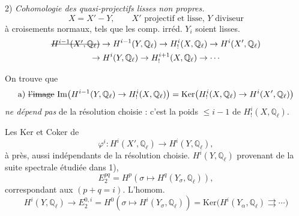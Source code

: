 \documentclass[11pt,a4paper]{article}
\begin{document}

2) \emph{Cohomologie des   quasi-projectifs lisses non propres.}
\[
  X = X' - Y, \qquad X' \text{ projectif et lisse, } Y \text{ diviseur}
\]
à croisements normaux, tels que les comp. irréd. $Y_i$ soient lisses.
\begin{gather*}
  \text{\struck{$H^{i-1}(X', \mathbb{Q}_\ell)$}} \to H^{i-1}(Y, \mathbb{Q}_\ell) \to H^{i}_{!}(X, \mathbb{Q}_\ell) \to H^{i}(X', \mathbb{Q}_\ell) \\
  \to H^{i}(Y, \mathbb{Q}_\ell) \to H^{i+1}_{!}(X, \mathbb{Q}_\ell) \to \cdots
  \end{gather*}

On trouve que
\[
  \text{a) \struck{l'image}}\ \mathrm{Im}\bigl(H^{i-1}(Y, \mathbb{Q}_\ell) \to H^{i}_{!}(X, \mathbb{Q}_\ell)\bigr)
  = \mathrm{Ker}\bigl(H^{i}_{!}(X, \mathbb{Q}_\ell) \to H^{i}(X', \mathbb{Q}_\ell)\bigr)
\]
\emph{ne dépend pas} de la résolution choisie : c'est la 
 poids $\leqslant i-1$ de $H^{i}_{!}(X, \mathbb{Q}_\ell)$.

\struck{\ill{}} Les Ker et Coker de
\[
  \varphi^{i} : H^{i}(X', \mathbb{Q}_\ell) \to H^{i}(Y, \mathbb{Q}_\ell),
\]
à   près,  aussi indépendants de la
résolution choisie. \struck{\ill{}}  \struck{\ill{}} \ill{} $H^{i}(Y, \mathbb{Q}_\ell)$ provenant de la
suite spectrale étudiée dans 1),
\[
  E_2^{pq} = H^{p}(\sigma \mapsto H^{q}(Y_\sigma, \mathbb{Q}_\ell)),
\]
correspondant aux \uncertain{\ill{}}  $(p+q = i)$. L'homom.
\[
  H^{i}(Y, \mathbb{Q}_\ell) \to E_2^{0,i} = H^{0}(\sigma \mapsto H^{i}(Y_\sigma, \mathbb{Q}_\ell)) = \mathrm{Ker}\bigl(H^{i}(Y_\alpha, \mathbb{Q}_\ell) \rightrightarrows \cdots\bigr)
\]
\end{document}
